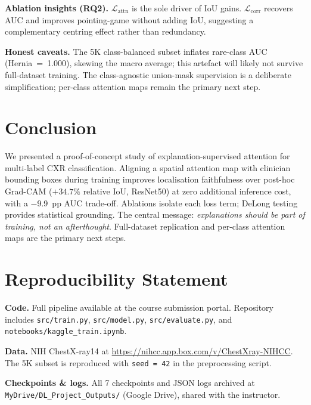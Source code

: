 \documentclass[10pt,twocolumn,letterpaper]{article}
\begin{document}
\noindent\textbf{Ablation insights (RQ2).}
$\mathcal{L}_{\text{attn}}$ is the sole driver of IoU gains.
$\mathcal{L}_{\text{corr}}$ recovers AUC and improves pointing-game without adding
IoU, suggesting a complementary centring effect rather than redundancy.

\noindent\textbf{Honest caveats.}
The 5K class-balanced subset inflates rare-class AUC (Hernia~=~1.000), skewing the
macro average; this artefact will likely not survive full-dataset training.
The class-agnostic union-mask supervision is a deliberate simplification; per-class
attention maps remain the primary next step.

\section{Conclusion}

We presented a proof-of-concept study of explanation-supervised attention for
multi-label CXR classification. Aligning a spatial attention map with clinician
bounding boxes during training improves localisation faithfulness over post-hoc
Grad-CAM ($+34.7\%$ relative IoU, ResNet50) at zero additional inference cost,
with a $-$9.9~pp AUC trade-off. Ablations isolate each loss term; DeLong testing
provides statistical grounding. The central message: \emph{explanations should be
part of training, not an afterthought}. Full-dataset replication and per-class
attention maps are the primary next steps.

\section*{Reproducibility Statement}

\noindent\textbf{Code.} Full pipeline available at the course submission portal.
Repository includes \texttt{src/train.py}, \texttt{src/model.py},
\texttt{src/evaluate.py}, and \texttt{notebooks/kaggle\_train.ipynb}.

\noindent\textbf{Data.} NIH ChestX-ray14 at
\url{https://nihcc.app.box.com/v/ChestXray-NIHCC}. The 5K subset is reproduced
with \texttt{seed = 42} in the preprocessing script.

\noindent\textbf{Checkpoints \& logs.} All 7 checkpoints and JSON logs archived
at \texttt{MyDrive/DL\_Project\_Outputs/} (Google Drive), shared with the instructor.
\end{document}
